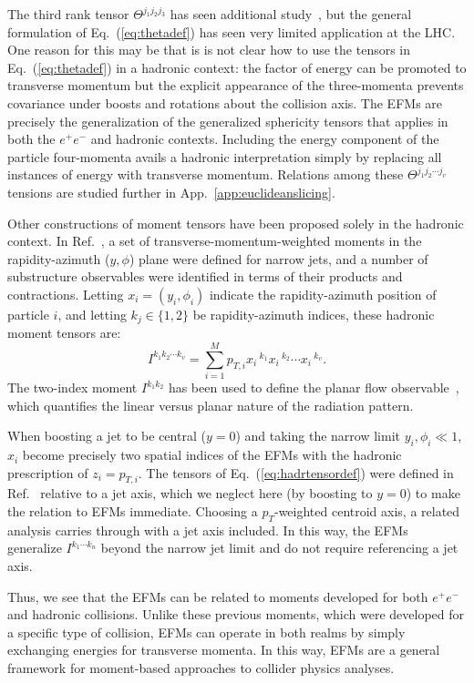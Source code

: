 \documentclass[aps,prd,floatfix,preprintnumbers,twocolumn,groupedaddress,nofootinbib,longbibliography,10pt]{revtex4-1}
\DeclareRobustCommand{\App}[1]{App.~\ref{#1}}
\DeclareRobustCommand{\Eq}[1]{Eq.~(\ref{#1})}
\DeclareRobustCommand{\Ref}[1]{Ref.~\cite{#1}}
\begin{document}
The third rank tensor $\Theta^{j_1j_2j_3}$ has seen additional study~\cite{Dagan:2011qy}, but the general formulation of \Eq{eq:thetadef} has seen very limited application at the LHC.
%
One reason for this may be that is is not clear how to use the tensors in \Eq{eq:thetadef} in a hadronic context: the factor of energy can be promoted to transverse momentum but the explicit appearance of the three-momenta prevents covariance under boosts and rotations about the collision axis.
%
The EFMs are precisely the generalization of the generalized sphericity tensors that applies in both the $e^+e^-$ and hadronic contexts.
%
Including the energy component of the particle four-momenta avails a hadronic interpretation simply by replacing all instances of energy with transverse momentum.
%
Relations among these $\Theta^{j_1j_2\cdots j_v}$ tensions are studied further in \App{app:euclideanslicing}.


Other constructions of moment tensors have been proposed solely in the hadronic context.
%
In \Ref{GurAri:2011vx}, a set of transverse-momentum-weighted moments in the rapidity-azimuth ($y,\phi$) plane were defined for narrow jets, and a number of substructure observables were identified in terms of their products and contractions.
%
Letting $x_i = (y_i,\phi_i)$ indicate the rapidity-azimuth position of particle $i$, and letting $k_j\in\{1,2\}$ be rapidity-azimuth indices, these hadronic moment tensors are:
\begin{equation}
\label{eq:hadrtensordef}
I^{k_1k_2\cdots k_v} = \sum_{i=1}^M p_{T,i} x_i\,^{k_1} x_i\,^{k_2} \cdots x_i\,^{k_v}.
\end{equation}
%
The two-index moment $I^{k_1k_2}$ has been used to define the planar flow observable~\cite{Thaler:2008ju,Almeida:2008tp}, which quantifies the linear versus planar nature of the radiation pattern.


When boosting a jet to be central ($y = 0$) and taking the narrow limit $y_i,\phi_i \ll 1$, $x_i$ become precisely two spatial indices of the EFMs with the hadronic prescription of $z_i = p_{T,i}$.
%
The tensors of \Eq{eq:hadrtensordef} were defined in \Ref{GurAri:2011vx} relative to a jet axis, which we neglect here (by boosting to $y=0$) to make the relation to EFMs immediate. 
%
Choosing a $p_T$-weighted centroid axis, a related analysis carries through with a jet axis included.
%
In this way, the EFMs generalize $I^{k_1\cdots k_n}$ beyond the narrow jet limit and do not require referencing a jet axis.


Thus, we see that the EFMs can be related to moments developed for both $e^+e^-$ and hadronic collisions.
%
Unlike these previous moments, which were developed for a specific type of collision, EFMs can operate in both realms by simply exchanging energies for transverse momenta.
%
In this way, EFMs are a general framework for moment-based approaches to collider physics analyses.
\end{document}
